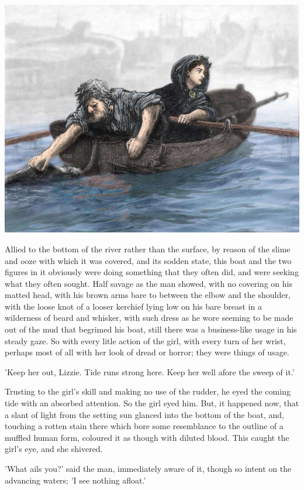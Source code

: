 \includegraphics[scale=0.42]{01-01-02}

Allied to the bottom of the river rather than the surface, by reason
of the slime and ooze with which it was covered, and its sodden
state, this boat and the two figures in it obviously were doing
something that they often did, and were seeking what they often
sought. Half savage as the man showed, with no covering on his
matted head, with his brown arms bare to between the elbow and
the shoulder, with the loose knot of a looser kerchief lying low on
his bare breast in a wilderness of beard and whisker, with such
dress as he wore seeming to be made out of the mud that begrimed
his boat, still there was a business-like usage in his steady gaze.
So with every litle action of the girl, with every turn of her wrist,
perhaps most of all with her look of dread or horror; they were
things of usage.

'Keep her out, Lizzie. Tide runs strong here. Keep her well afore
the sweep of it.'

Trusting to the girl's skill and making no use of the rudder, he eyed
the coming tide with an absorbed attention. So the girl eyed him.
But, it happened now, that a slant of light from the setting sun
glanced into the bottom of the boat, and, touching a rotten stain
there which bore some resemblance to the outline of a muffled
human form, coloured it as though with diluted blood. This caught
the girl's eye, and she shivered.

'What ails you?' said the man, immediately aware of it, though so
intent on the advancing waters; 'I see nothing afloat.'

